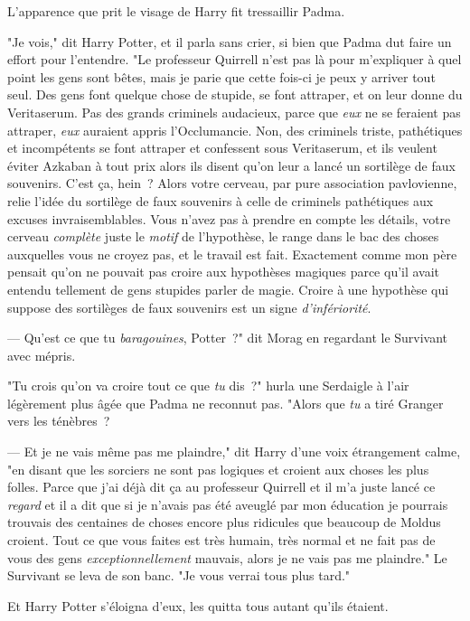 L'apparence que prit le visage de Harry fit tressaillir Padma.

"Je vois," dit Harry Potter, et il parla sans crier, si bien que Padma dut faire un effort pour l'entendre. "Le professeur Quirrell n'est pas là pour m'expliquer à quel point les gens sont bêtes, mais je parie que cette fois-ci je peux y arriver tout seul. Des gens font quelque chose de stupide, se font attraper, et on leur donne du Veritaserum. Pas des grands criminels audacieux, parce que \emph{eux} ne se feraient pas attraper, \emph{eux} auraient appris l'Occlumancie. Non, des criminels triste, pathétiques et incompétents se font attraper et confessent sous Veritaserum, et ils veulent éviter Azkaban à tout prix alors ils disent qu'on leur a lancé un sortilège de faux souvenirs. C'est ça, hein~? Alors votre cerveau, par pure association pavlovienne, relie l'idée du sortilège de faux souvenirs à celle de criminels pathétiques aux excuses invraisemblables. Vous n'avez pas à prendre en compte les détails, votre cerveau \emph{complète} juste le \emph{motif} de l'hypothèse, le range dans le bac des choses auxquelles vous ne croyez pas, et le travail est fait. Exactement comme mon père pensait qu'on ne pouvait pas croire aux hypothèses magiques parce qu'il avait entendu tellement de gens stupides parler de magie. Croire à une hypothèse qui suppose des sortilèges de faux souvenirs est un signe \emph{d'infériorité}.

--- Qu'est ce que tu \emph{baragouines}, Potter~?" dit Morag en regardant le Survivant avec mépris.

"Tu crois qu'on va croire tout ce que \emph{tu} dis~?" hurla une Serdaigle à l'air légèrement plus âgée que Padma ne reconnut pas. "Alors que \emph{tu} a tiré Granger vers les ténèbres~?

--- Et je ne vais même pas me plaindre," dit Harry d'une voix étrangement calme, "en disant que les sorciers ne sont pas logiques et croient aux choses les plus folles. Parce que j'ai déjà dit ça au professeur Quirrell et il m'a juste lancé ce \emph{regard} et il a dit que si je n'avais pas été aveuglé par mon éducation je pourrais trouvais des centaines de choses encore plus ridicules que beaucoup de Moldus croient. Tout ce que vous faites est très humain, très normal et ne fait pas de vous des gens \emph{exceptionnellement} mauvais, alors je ne vais pas me plaindre." Le Survivant se leva de son banc. "Je vous verrai tous plus tard."

Et Harry Potter s'éloigna d'eux, les quitta tous autant qu'ils étaient.

